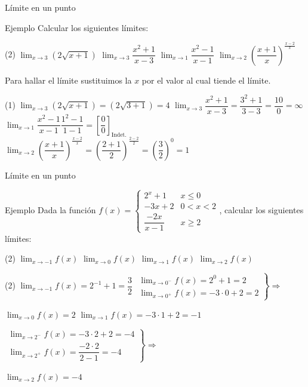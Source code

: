 \documentclass[8pt,handout]{beamer}
\newcommand{\limite}[2]{\displaystyle \lim_{x \rightarrow #1}{#2}}
\begin{document}
\begin{frame}{Límite en un punto}
\begin{exampleblock}{Ejemplo}
Calcular los siguientes límites:
\begin{tasks}[label=\alph*)](2)
\task $\limite{3}{\left( 2 \sqrt{x+1} \right)}$
\task $\limite{3}{\dfrac{x^2+1}{x-3}}$
\task $\limite{1}{\dfrac{x^2-1}{x-1}}$
\task $\limite{2}{\left( \dfrac{x+1}{x} \right)^{\frac{x-2}{x}}}$
\end{tasks}
\end{exampleblock}
Para hallar el límite sustituimos la $x$ por el valor al cual tiende el límite.
\begin{tasks}[label=\alph*)](1)
\task $\limite{3}{\left( 2 \sqrt{x+1} \right)}= \left( 2 \sqrt{3+1} \right)= 4 $
\task $\limite{3}{\dfrac{x^2+1}{x-3}}=\dfrac{3^2+1}{3-3}=\dfrac{10}{0} = \infty$
\task $\limite{1}{\dfrac{x^2-1}{x-1}}\dfrac{1^2-1}{1-1}=\left[\dfrac{0}{0}\right]_{\text{Indet.}}$
\task $\limite{2}{\left( \dfrac{x+1}{x} \right)^{\frac{x-2}{x}}}=\left( \dfrac{2+1}{2} \right)^{\frac{2-2}{2}}=\left( \dfrac{3}{2} \right)^{0}=1$
\end{tasks}
\end{frame}

\begin{frame}{Límite en un punto}
\begin{exampleblock}{Ejemplo}
Dada la función $f(x)=\begin{cases} 2^x+1 & x \leq 0 \\ -3x+2 & 0 <x < 2 \\  \dfrac{-2x}{x-1} & x \geq 2\end{cases} $, calcular los siguientes límites:
\begin{tasks}[label=\alph*)](2)
\task $\limite{-1}{f(x)}$
\task $\limite{0}{f(x)}$
\task $\limite{1}{f(x)}$
\task $\limite{2}{f(x)}$
\end{tasks}
\end{exampleblock}

\begin{tasks}[label=\alph*)](2)
\task $\limite{-1}{f(x)}= 2^{-1}+1=\dfrac{3}{2}$
\task 
$\left. \begin{array}{l} \limite{0^{-}}{f(x)} = 2^0+1
=2 \\ \limite{0^{+}}{f(x)}= -3 \cdot 0 +2 = 2 
\end{array} \right\rbrace \Rightarrow$

$ \limite{0}{f(x)}=2 $
\task $\limite{1}{f(x)}=-3 \cdot 1 +2 = -1$

\task 
$\left. \begin{array}{l} \limite{2^{-}}{f(x)} = -3 \cdot 2 +2
=-4 \\ \limite{2^{+}}{f(x)}= \dfrac{-2 \cdot 2}{2-1} = -4 
\end{array} \right\rbrace \Rightarrow$

$ \limite{2}{f(x)}=-4 $
\end{tasks}
\end{frame}
\end{document}
